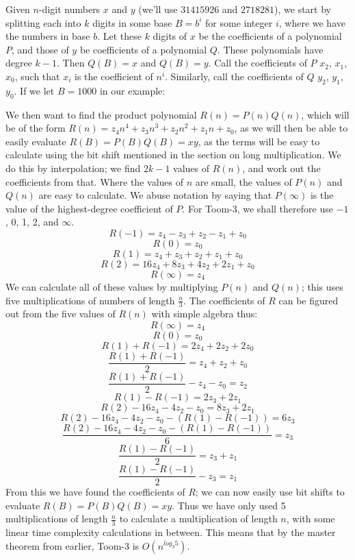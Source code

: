 \documentclass[10pt,a4paper]{article}
\begin{document}
\begin{multicols}{2}
	Given \(n\)-digit numbers \(x\) and \(y\) (we'll use \(31415926\) and \(2718281\)), we start by splitting each into \(k\) digits in some base \(B=b^i\) for some integer \(i\), where we have the numbers in base \(b\).
	Let these \(k\) digits of \(x\) be the coefficients of a polynomial \(P\), and those of \(y\) be coefficients of a polynomial \(Q\). These polynomials have degree \(k-1\). Then \(Q(B)=x\) and \(Q(B)=y\). Call the coefficients of \(P\) \(x_2\), \(x_1\), \(x_0\), such that \(x_i\) is the coefficient of \(n^i\). Similarly, call the coefficients of \(Q\) \(y_2\), \(y_1\), \(y_0\). If we let \(B=1000\) in our example:
	
	
	
	We then want to find the product polynomial \(R(n)=P(n)Q(n)\), which will be of the form \(R(n)=z_4n^4+z_3n^3+z_2n^2+z_1n+z_0\), as we will then be able to easily evaluate \(R(B)=P(B)Q(B)=xy\), as the terms will be easy to calculate using the bit shift mentioned in the section on long multiplication. We do this by interpolation; we find \(2k-1\) values of \(R(n)\), and work out the coefficients from that. Where the values of \(n\) are small, the values of \(P(n)\) and \(Q(n)\) are easy to calculate. We abuse notation by saying that \(P(\infty)\) is the value of the highest-degree coefficient of \(P\). For Toom-3, we shall therefore use \(-1\), 0, 1, 2, and \(\infty\).
	\[R(-1)=z_4-z_3+z_2-z_1+z_0\]
	\[R(0)=z_0\]
	\[R(1)=z_4+z_3+z_2+z_1+z_0\]
	\[R(2)=16z_4+8z_3+4z_2+2z_1+z_0\]
	\[R(\infty)=z_4\]
	We can calculate all of these values by multiplying \(P(n)\) and \(Q(n)\); this uses five multiplications of numbers of length \(\frac{n}{3}\). The coefficients of \(R\) can be figured out from the five values of \(R(n)\) with simple algebra thus:
	\[R(\infty)=z_4\]
	\[R(0)=z_0\]
	\[R(1)+R(-1)=2z_4+2z_2+2z_0\]
	\[\frac{R(1)+R(-1)}{2}=z_4+z_2+z_0\]
	\[\frac{R(1)+R(-1)}{2}-z_4-z_0=z_2\]
	\[R(1)-R(-1)=2z_3+2z_1\]
	\[R(2)-16z_4-4z_2-z_0=8z_3+2z_1\]
	\[R(2)-16z_4-4z_2-z_0-(R(1)-R(-1))=6z_3\]
	\[\frac{R(2)-16z_4-4z_2-z_0-(R(1)-R(-1))}{6}=z_3\]
	\[\frac{R(1)-R(-1)}{2}=z_3+z_1\]
	\[\frac{R(1)-R(-1)}{2}-z_3=z_1\]
	From this we have found the coefficients of \(R\); we can now easily use bit shifts to evaluate \(R(B)=P(B)Q(B)=xy\). Thus we have only used 5 multiplications of length \(\frac{n}{3}\) to calculate a multiplication of length \(n\), with some linear time complexity calculations in between. This means that by the master theorem from earlier, Toom-3 is \(O(n^{log_{3}5})\).

\end{multicols}
\end{document}
